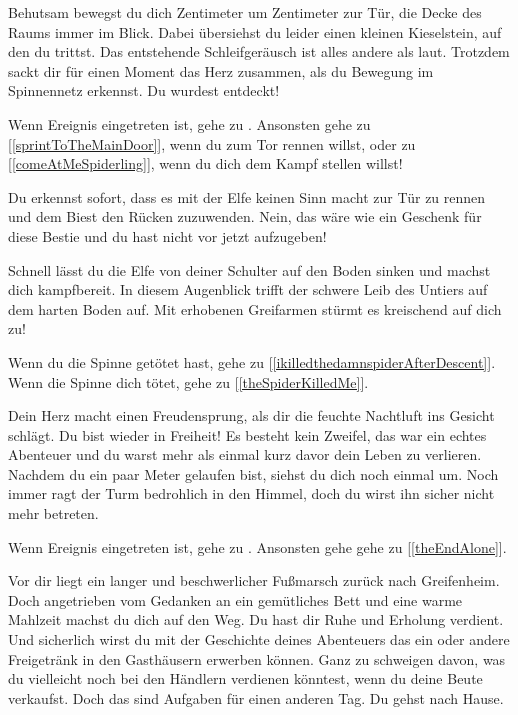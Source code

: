 
Behutsam bewegst du dich Zentimeter um Zentimeter zur Tür, die Decke des Raums immer im Blick. Dabei übersiehst du leider einen kleinen Kieselstein, auf den du trittst. Das entstehende Schleifgeräusch ist alles andere als laut. Trotzdem sackt dir für einen Moment das Herz zusammen, als du Bewegung im Spinnennetz erkennst. Du wurdest entdeckt!

Wenn Ereignis  eingetreten ist, gehe zu . Ansonsten gehe zu [\ref{sprintToTheMainDoor}], wenn du zum Tor rennen willst, oder zu [\ref{comeAtMeSpiderling}], wenn du dich dem Kampf stellen willst!


Du erkennst sofort, dass es mit der Elfe keinen Sinn macht zur Tür zu rennen und dem Biest den Rücken zuzuwenden. Nein, das wäre wie ein Geschenk für diese Bestie und du hast nicht vor jetzt aufzugeben!

Schnell lässt du die Elfe von deiner Schulter auf den Boden sinken und machst dich kampfbereit. In diesem Augenblick trifft der schwere Leib des Untiers auf dem harten Boden auf. Mit erhobenen Greifarmen stürmt es kreischend auf dich zu!


Wenn du die Spinne getötet hast, gehe zu [\ref{ikilledthedamnspiderAfterDescent}].
\\Wenn die Spinne dich tötet, gehe zu [\ref{theSpiderKilledMe}].


Dein Herz macht einen Freudensprung, als dir die feuchte Nachtluft ins Gesicht schlägt. Du bist wieder in Freiheit! Es besteht kein Zweifel, das war ein echtes Abenteuer und du warst mehr als einmal kurz davor dein Leben zu verlieren. Nachdem du ein paar Meter gelaufen bist, siehst du dich noch einmal um. Noch immer ragt der Turm bedrohlich in den Himmel, doch du wirst ihn sicher nicht mehr betreten.

Wenn Ereignis  eingetreten ist, gehe zu . Ansonsten gehe gehe zu [\ref{theEndAlone}].


Vor dir liegt ein langer und beschwerlicher Fußmarsch zurück nach Greifenheim. Doch angetrieben vom Gedanken an ein gemütliches Bett und eine warme Mahlzeit machst du dich auf den Weg. Du hast dir Ruhe und Erholung verdient. Und sicherlich wirst du mit der Geschichte deines Abenteuers das ein oder andere Freigetränk in den Gasthäusern erwerben können. Ganz zu schweigen davon, was du vielleicht noch bei den Händlern verdienen könntest, wenn du deine Beute verkaufst. Doch das sind Aufgaben für einen anderen Tag. Du gehst nach Hause.

